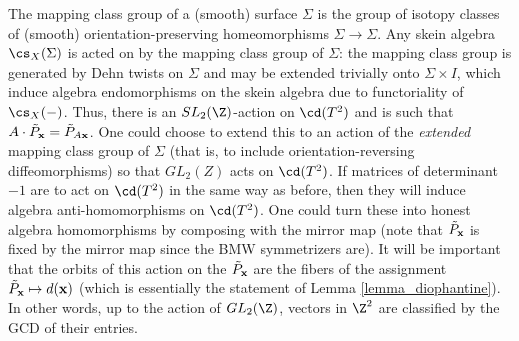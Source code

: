 \begin{remark}\label{remark_gl2z}
The mapping class group of a (smooth) surface $\Sigma$ is the group of isotopy classes of (smooth) orientation-preserving homeomorphisms $\Sigma \to \Sigma$. Any skein algebra $\cs_X(\Sigma)$ is acted on by the mapping class group of $\Sigma$: the mapping class group is generated by Dehn twists on $\Sigma$ and may be extended trivially onto $\Sigma \times I$, which induce algebra endomorphisms on the skein algebra due to functoriality of $\cs_X(-)$. Thus, there is an $SL_2(\Z)$-action on $\cd(T^2)$ and is such that $A \cdot \tilde{P}_{\mathbf{x}} = \tilde{P}_{A{\mathbf{x}}}$. One could choose to extend this to an action of the \textit{extended} mapping class group of $\Sigma$ (that is, to include orientation-reversing diffeomorphisms) so that $GL_2(Z)$ acts on $\cd(T^2)$. If matrices of determinant $-1$ are to act on $\cd(T^2)$ in the same way as before, then they will induce algebra anti-homomorphisms on $\cd(T^2)$. One could turn these into honest algebra homomorphisms by composing with the mirror map (note that $\tilde{P}_{\mathbf{x}}$ is fixed by the mirror map since the BMW symmetrizers are). It will be important that the orbits of this action on the $\tilde{P}_{{\mathbf{x}}}$ are the fibers of the assignment $\tilde{P}_{{\mathbf{x}}} \mapsto d({\mathbf{x}})$ (which is essentially the statement of Lemma \ref{lemma_diophantine}). In other words, up to the action of $GL_2(\Z)$, vectors in $\Z^2$ are classified by the GCD of their entries.
\end{remark}

